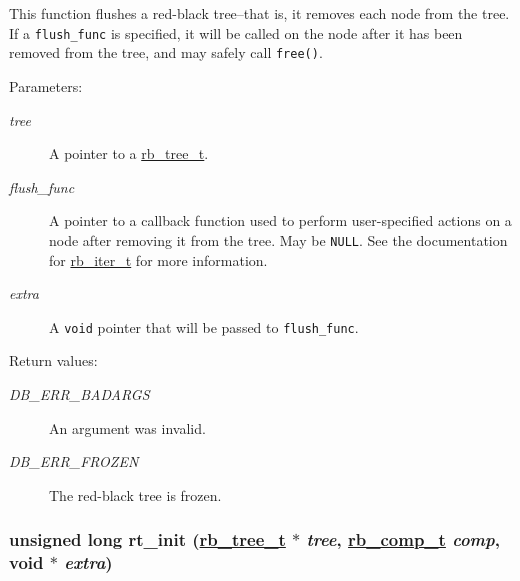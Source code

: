 This function flushes a red-black tree--that is, it removes each node from the tree. If a {\tt flush\_\-func} is specified, it will be called on the node after it has been removed from the tree, and may safely call {\tt free()}.\begin{Desc}
\item[Parameters: ]\par
\begin{description}
\item[{\em 
tree}]A pointer to a \hyperlink{group__dbprim__rbtree_a0}{rb\_\-tree\_\-t}. \item[{\em 
flush\_\-func}]A pointer to a callback function used to perform user-specified actions on a node after removing it from the tree. May be {\tt NULL}. See the documentation for \hyperlink{group__dbprim__rbtree_a2}{rb\_\-iter\_\-t} for more information. \item[{\em 
extra}]A {\tt void} pointer that will be passed to {\tt flush\_\-func}.\end{description}
\end{Desc}
\begin{Desc}
\item[Return values: ]\par
\begin{description}
\item[{\em 
DB\_\-ERR\_\-BADARGS}]An argument was invalid. \item[{\em 
DB\_\-ERR\_\-FROZEN}]The red-black tree is frozen. \end{description}
\end{Desc}
\hypertarget{group__dbprim__rbtree_a5}{
\subsubsection[rt\_\-init]{\setlength{\rightskip}{0pt plus 5cm}unsigned long rt\_\-init (\hyperlink{group__dbprim__rbtree_a0}{rb\_\-tree\_\-t} $\ast$ {\em tree}, \hyperlink{group__dbprim__rbtree_a3}{rb\_\-comp\_\-t} {\em comp}, void $\ast$ {\em extra})}}
\label{group__dbprim__rbtree_a5}


